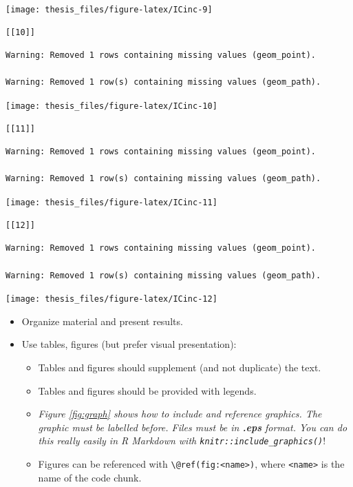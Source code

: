 \documentclass[a4paper,11pt]{article}
\begin{document}
\begin{center}\texttt{[image: thesis\_files/figure-latex/ICinc-9]} \end{center}
\begin{verbatim}
[[10]]
\end{verbatim}
\begin{verbatim}
Warning: Removed 1 rows containing missing values (geom_point).

Warning: Removed 1 row(s) containing missing values (geom_path).
\end{verbatim}
\begin{center}\texttt{[image: thesis\_files/figure-latex/ICinc-10]} \end{center}
\begin{verbatim}
[[11]]
\end{verbatim}
\begin{verbatim}
Warning: Removed 1 rows containing missing values (geom_point).

Warning: Removed 1 row(s) containing missing values (geom_path).
\end{verbatim}
\begin{center}\texttt{[image: thesis\_files/figure-latex/ICinc-11]} \end{center}
\begin{verbatim}
[[12]]
\end{verbatim}
\begin{verbatim}
Warning: Removed 1 rows containing missing values (geom_point).

Warning: Removed 1 row(s) containing missing values (geom_path).
\end{verbatim}
\begin{center}\texttt{[image: thesis\_files/figure-latex/ICinc-12]} \end{center}
\begin{itemize}
\item
  Organize material and present results.
\item
  Use tables, figures (but prefer visual presentation):
  \begin{itemize}
  \item
    Tables and figures should supplement (and not duplicate) the text.
  \item
    Tables and figures should be provided with legends.
  \item
    \emph{Figure \ref{fig:graph} shows how to include and reference graphics.
    The graphic must be labelled before. Files must be in \textbf{.eps} format. You
    can do this really easily in R Markdown with \texttt{knitr::include\_graphics()}}!
  \item
    Figures can be referenced with \texttt{\textbackslash{}@ref(fig:\textless{}name\textgreater{})}, where \texttt{\textless{}name\textgreater{}} is the
    name of the code chunk.
  \end{itemize}
\end{itemize}
\end{document}
